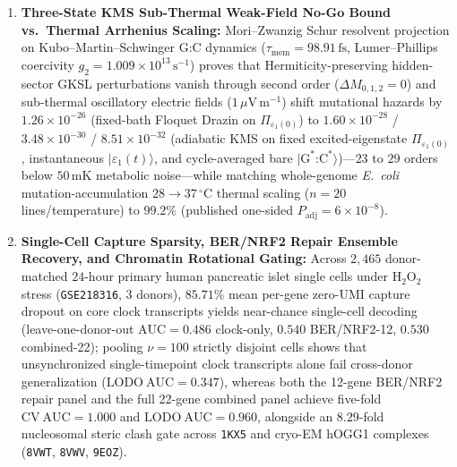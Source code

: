 \documentclass[11pt,letterpaper]{article}
\begin{document}
\begin{enumerate}[leftmargin=1.6em,itemsep=2pt,topsep=2pt]
    \item \textbf{Three-State KMS Sub-Thermal Weak-Field No-Go Bound vs.\ Thermal Arrhenius Scaling:} Mori--Zwanzig Schur resolvent projection on Kubo--Martin--Schwinger G:C dynamics ($\tau_{\mathrm{mem}} = 98.91\,\mathrm{fs}$, Lumer--Phillips coercivity $g_2 = 1.009 \times 10^{13}\,\mathrm{s}^{-1}$) proves that Hermiticity-preserving hidden-sector GKSL perturbations vanish through second order ($\Delta M_{0,1,2} = 0$) and sub-thermal oscillatory electric fields ($1\,\mu\mathrm{V\,m^{-1}}$) shift mutational hazards by $1.26 \times 10^{-26}$ (fixed-bath Floquet Drazin on $\Pi_{\varepsilon_1(0)}$) to $1.60 \times 10^{-28}$ / $3.48 \times 10^{-30}$ / $8.51 \times 10^{-32}$ (adiabatic KMS on fixed excited-eigenstate $\Pi_{\varepsilon_1(0)}$, instantaneous $|\varepsilon_1(t)\rangle$, and cycle-averaged bare $|\mathrm{G}^*\text{:}\mathrm{C}^*\rangle$)---$23$ to $29$ orders below $50\,\mathrm{mK}$ metabolic noise---while matching whole-genome \emph{E.\ coli} mutation-accumulation $28 \to 37\,^\circ\mathrm{C}$ thermal scaling ($n=20$ lines/temperature) to $99.2\%$ (published one-sided $P_{\mathrm{adj}} = 6 \times 10^{-8}$).
    \item \textbf{Single-Cell Capture Sparsity, BER/NRF2 Repair Ensemble Recovery, and Chromatin Rotational Gating:} Across $2{,}465$ donor-matched $24$-hour primary human pancreatic islet single cells under $\mathrm{H_2O_2}$ stress (\texttt{GSE218316}, $3$ donors), $85.71\%$ mean per-gene zero-UMI capture dropout on core clock transcripts yields near-chance single-cell decoding (leave-one-donor-out $\mathrm{AUC} = 0.486$ clock-only, $0.540$ BER/NRF2-12, $0.530$ combined-22); pooling $\nu = 100$ strictly disjoint cells shows that unsynchronized single-timepoint clock transcripts alone fail cross-donor generalization ($\mathrm{LODO\ AUC} = 0.347$), whereas both the 12-gene BER/NRF2 repair panel and the full 22-gene combined panel achieve five-fold $\mathrm{CV\ AUC} = 1.000$ and $\mathrm{LODO\ AUC} = 0.960$, alongside an $8.29$-fold nucleosomal steric clash gate across \texttt{1KX5} and cryo-EM hOGG1 complexes (\texttt{8VWT}, \texttt{8VWV}, \texttt{9EOZ}).

\end{enumerate}
\end{document}
